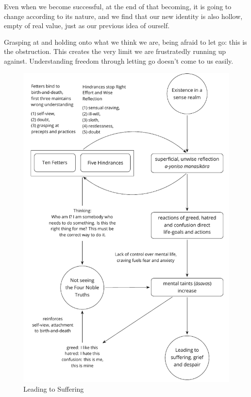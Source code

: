 Even when we become successful, at the end of that becoming, it is going
to change according to its nature, and we find that our new identity is
also hollow, empty of real value, just as our previous idea of ourself.

Grasping at and holding onto what we think we are, being afraid to let
go: this is the obstruction. This creates the very limit we are
frustratedly running up against. Understanding freedom through letting
go doesn't come to us easily.

\cleartoverso
\figurepagelayout

\begin{figure}[h]
\vspace*{-10mm}%
\caption{Leading to Suffering}\label{fig-leading-to-suffering}

\centering

\includegraphics[width=\linewidth]{./manuscript/tex/diagrams/leading-to-suffering.pdf}

\end{figure}

